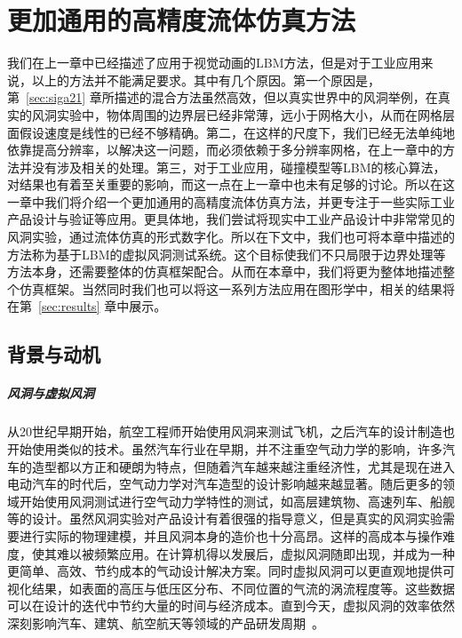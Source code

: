 \chapter{更加通用的高精度流体仿真方法}
\label{sec:sig23}

我们在上一章中已经描述了应用于视觉动画的LBM方法，但是对于工业应用来说，以上的方法并不能满足要求。其中有几个原因。第一个原因是，第~\ref{sec:siga21} 章所描述的混合方法虽然高效，但以真实世界中的风洞举例，在真实的风洞实验中，物体周围的边界层已经非常薄，远小于网格大小，从而在网格层面假设速度是线性的已经不够精确。第二，在这样的尺度下，我们已经无法单纯地依靠提高分辨率，以解决这一问题，而必须依赖于多分辨率网格，在上一章中的方法并没有涉及相关的处理。第三，对于工业应用，碰撞模型等LBM的核心算法，对结果也有着至关重要的影响，而这一点在上一章中也未有足够的讨论。所以在这一章中我们将介绍一个更加通用的高精度流体仿真方法，并更专注于一些实际工业产品设计与验证等应用。更具体地，我们尝试将现实中工业产品设计中非常常见的风洞实验，通过流体仿真的形式数字化。所以在下文中，我们也可将本章中描述的方法称为基于LBM的虚拟风洞测试系统。这个目标使我们不只局限于边界处理等方法本身，还需要整体的仿真框架配合。从而在本章中，我们将更为整体地描述整个仿真框架。当然同时我们也可以将这一系列方法应用在图形学中，相关的结果将在第~\ref{sec:results} 章中展示。

\section{背景与动机}
\paragraph{风洞与虚拟风洞}
从20世纪早期开始，航空工程师开始使用风洞来测试飞机，之后汽车的设计制造也开始使用类似的技术。虽然汽车行业在早期，并不注重空气动力学的影响，许多汽车的造型都以方正和硬朗为特点，但随着汽车越来越注重经济性，尤其是现在进入电动汽车的时代后，空气动力学对汽车造型的设计影响越来越显著。随后更多的领域开始使用风洞测试进行空气动力学特性的测试，如高层建筑物、高速列车、船舰等的设计。虽然风洞实验对产品设计有着很强的指导意义，但是真实的风洞实验需要进行实际的物理建模，并且风洞本身的造价也十分高昂。这样的高成本与操作难度，使其难以被频繁应用。在计算机得以发展后，虚拟风洞随即出现，并成为一种更简单、高效、节约成本的气动设计解决方案。同时虚拟风洞可以更直观地提供可视化结果，如表面的高压与低压区分布、不同位置的气流的涡流程度等。这些数据可以在设计的迭代中节约大量的时间与经济成本。直到今天，虚拟风洞的效率依然深刻影响汽车、建筑、航空航天等领域的产品研发周期~\cite{HighriseBuildings,windScience}。

